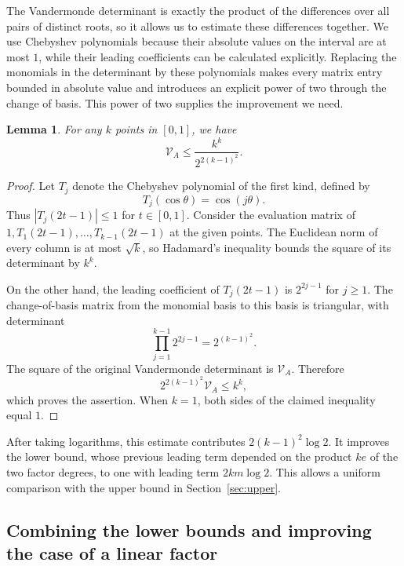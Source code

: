 \documentclass[11pt,a4paper]{article}
\numberwithin{equation}{section}
\newtheorem{lemma}[theorem]{Lemma}
\theoremstyle{definition}
\begin{document}
The Vandermonde determinant is exactly the product of the differences over all pairs of distinct roots, so it allows us to estimate these differences together. We use Chebyshev polynomials because their absolute values on the interval are at most \(1\), while their leading coefficients can be calculated explicitly. Replacing the monomials in the determinant by these polynomials makes every matrix entry bounded in absolute value and introduces an explicit power of two through the change of basis. This power of two supplies the improvement we need.

\begin{lemma}\label{lem:vandermonde}
For any \(k\) points in \([0,1]\), we have
\begin{equation}
\mathcal V_A\le\frac{k^k}{2^{2(k-1)^2}}.
\label{eq:old6.4}
\end{equation}
\end{lemma}

\begin{proof}
Let \(T_j\) denote the Chebyshev polynomial of the first kind, defined by
\[
T_j(\cos\theta)=\cos(j\theta).
\]
Thus \(|T_j(2t-1)|\le1\) for \(t\in[0,1]\). Consider the evaluation matrix of
\(1,T_1(2t-1),\ldots,T_{k-1}(2t-1)\) at the given points. The Euclidean norm of every column is at most \(\sqrt k\), so Hadamard's inequality bounds the square of its determinant by \(k^k\).

On the other hand, the leading coefficient of \(T_j(2t-1)\) is \(2^{2j-1}\) for \(j\ge1\). The change-of-basis matrix from the monomial basis to this basis is triangular, with determinant
\[
\prod_{j=1}^{k-1}2^{2j-1}=2^{(k-1)^2}.
\]
The square of the original Vandermonde determinant is \(\mathcal V_A\). Therefore
\[
2^{2(k-1)^2}\mathcal V_A\le k^k,
\]
which proves the assertion. When \(k=1\), both sides of the claimed inequality equal \(1\).
\end{proof}

After taking logarithms, this estimate contributes \(2(k-1)^2\log2\). It improves the lower bound, whose previous leading term depended on the product \(ke\) of the two factor degrees, to one with leading term \(2km\log2\). This allows a uniform comparison with the upper bound in Section~\ref{sec:upper}.

\subsection{Combining the lower bounds and improving the case of a linear factor}
\end{document}
